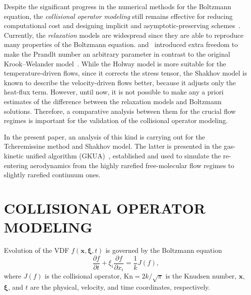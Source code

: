 \documentclass{aip-cp}
\newcommand{\Kn}{\mathrm{Kn}}
\newcommand{\pder}[2][]{\frac{\partial#1}{\partial#2}}
\newcommand{\bxi}{\boldsymbol{\xi}}
\newcommand{\bx}{\boldsymbol{x}}
\begin{document}
Despite the significant progress in the numerical methods for the Boltzmann equation,
the \emph{collisional operator modeling} still remains effective for reducing computational cost
and designing implicit and asymptotic-preserving schemes~\cite{Jin1999}.
Currently, the \emph{relaxation} models are widespread since they are able to reproduce many properties of the Boltzmann equation.
\citet{Holway1966} and~\citet{Shakhov1968} introduced extra freedom to make the Prandlt number
an arbitrary parameter in contrast to the original Krook--Welander model~\cite{Krook1954, Welander1954}.
While the Holway model is more suitable for the temperature-driven flows, since it corrects the stress tensor,
the Shakhov model is known to describe the velocity-driven flows better, because it adjusts only the heat-flux term.
However, until now, it is not possible to make any a priori estimates of the difference
between the relaxation models and Boltzmann solutions.
Therefore, a comparative analysis between them for the crucial flow regimes
is important for the validation of the collisional operator modeling.

In the present paper, an analysis of this kind is carrying out
for the Tcheremissine method and Shakhov model.
The latter is presented in the gas-kinetic unified algorithm (GKUA)~\cite{Li2004},
established and used to simulate the re-entering aerodynamics
from the highly rarefied free-molecular flow regimes to slightly rarefied continuum ones.

\section{COLLISIONAL OPERATOR MODELING}

Evolution of the VDF \(f(\bx,\bxi, t)\) is governed by the Boltzmann equation
\begin{equation}\label{eq:Boltzmann}
    \pder[f]{t} + \xi_i\pder[f]{x_i} = \frac1k J(f),
\end{equation}
where \(J(f)\) is the collisional operator, \(\Kn=2k/\sqrt\pi\) is the Knudsen number,
\(\bx\), \(\bxi\), and \(t\) are the physical, velocity, and time coordinates, respectively.
\end{document}
